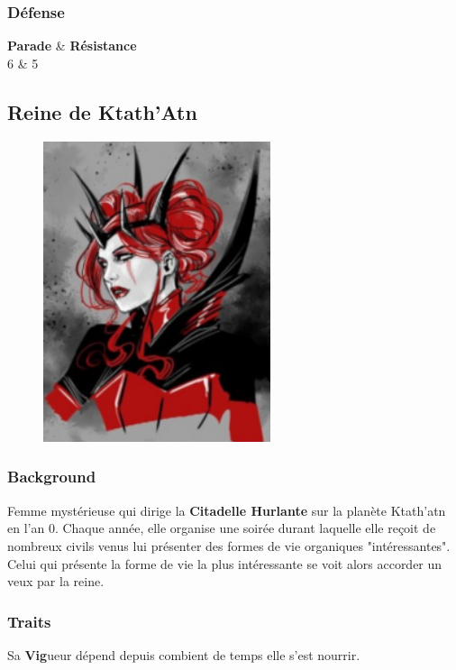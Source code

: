 \subsubsection{Défense}
\begin{itemtable}[ c c ]
    \textbf{Parade}     & \textbf{Résistance} \\
    6                   & 5 
\end{itemtable}

\newpage
\subsection{Reine de Ktath’Atn} \label{sec:ktath-atn-queen}
\begin{figure}[h!]
    \centering
    \includegraphics[height=250pt]{_img/pnjs/ktath-atn-queen.png}
\end{figure}
\subsubsection{Background}
Femme mystérieuse qui dirige la \textbf{Citadelle Hurlante} sur la planète Ktath’atn en l’an 0. Chaque année, elle organise une soirée durant laquelle elle reçoit de nombreux civils venus lui présenter des formes de vie organiques "intéressantes". Celui qui présente la forme de vie la plus intéressante se voit alors accorder un veux par la reine.

\subsubsection{Traits}

Sa \textbf{Vig}ueur dépend depuis combient de temps elle s’est nourrir. 

